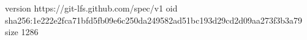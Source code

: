 version https://git-lfs.github.com/spec/v1
oid sha256:1e222e2fca71bfd5fb09e6c250da249582ad51bc193d29cd2d09aa273f3b3a79
size 1286
